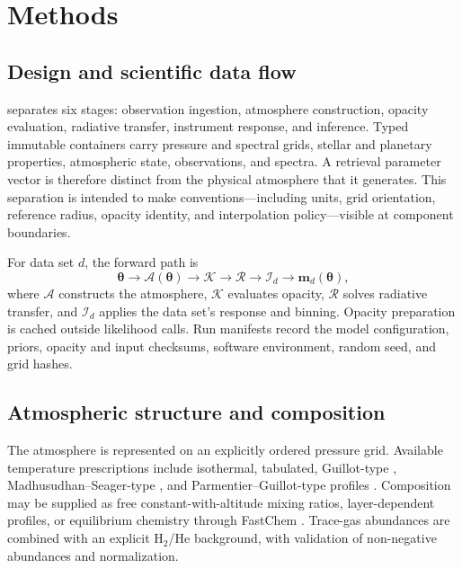 \section{Methods}
\label{sec:methods}

\subsection{Design and scientific data flow}

\ROBERT{} separates six stages: observation ingestion, atmosphere construction,
opacity evaluation, radiative transfer, instrument response, and inference.
Typed immutable containers carry pressure and spectral grids, stellar and
planetary properties, atmospheric state, observations, and spectra. A retrieval
parameter vector is therefore distinct from the physical atmosphere that it
generates. This separation is intended to make conventions---including units,
grid orientation, reference radius, opacity identity, and interpolation
policy---visible at component boundaries.

For data set $d$, the forward path is
\begin{equation}
 \boldsymbol{\theta}\rightarrow
 \mathcal{A}(\boldsymbol{\theta})\rightarrow
 \mathcal{K}\rightarrow
 \mathcal{R}\rightarrow
 \mathcal{I}_d\rightarrow
 \boldsymbol{m}_d(\boldsymbol{\theta}),
 \label{eq:dataflow}
\end{equation}
where $\mathcal{A}$ constructs the atmosphere, $\mathcal{K}$ evaluates opacity,
$\mathcal{R}$ solves radiative transfer, and $\mathcal{I}_d$ applies the data
set's response and binning. Opacity preparation is cached outside likelihood
calls. Run manifests record the model configuration, priors, opacity and input
checksums, software environment, random seed, and grid hashes.

\subsection{Atmospheric structure and composition}

The atmosphere is represented on an explicitly ordered pressure grid. Available
temperature prescriptions include isothermal, tabulated, Guillot-type
\citep{Guillot2010}, Madhusudhan--Seager-type \citep{MadhusudhanSeager2009},
and Parmentier--Guillot-type profiles \citep{ParmentierGuillot2014}.
Composition may be supplied as free constant-with-altitude mixing ratios,
layer-dependent profiles, or equilibrium chemistry through FastChem
\citep{Stock2018}. Trace-gas abundances are combined with an explicit H$_2$/He
background, with validation of non-negative abundances and normalization.

